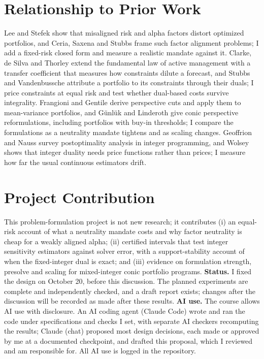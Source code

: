 \documentclass[11pt]{article}
\begin{document}
\section{Relationship to Prior Work}
Lee and Stefek \cite{lee2008risk} show that misaligned risk and alpha factors distort optimized portfolios, and Ceria, Saxena and Stubbs \cite{ceria2012factor} frame such factor alignment problems; I add a fixed-risk closed form and measure a realistic mandate against it. Clarke, de Silva and Thorley \cite{clarke2002portfolio} extend the fundamental law of active management with a transfer coefficient that measures how constraints dilute a forecast, and Stubbs and Vandenbussche \cite{stubbs2010constraint} attribute a portfolio to its constraints through their duals; I price constraints at equal risk and test whether dual-based costs survive integrality. Frangioni and Gentile \cite{frangioni2006perspective} derive perspective cuts and apply them to mean-variance portfolios, and G\"unl\"uk and Linderoth \cite{gunluk2010perspective} give conic perspective reformulations, including portfolios with buy-in thresholds; I compare the formulations as a neutrality mandate tightens and as scaling changes. Geoffrion and Nauss \cite{geoffrion1977parametric} survey postoptimality analysis in integer programming, and Wolsey \cite{wolsey1981integer} shows that integer duality needs price functions rather than prices; I measure how far the usual continuous estimators drift.

\section{Project Contribution}
This problem-formulation project is not new research; it contributes (i) an equal-risk account of what a neutrality mandate costs and why factor neutrality is cheap for a weakly aligned alpha; (ii) certified intervals that test integer sensitivity estimators against solver error, with a support-stability account of when the fixed-integer dual is exact; and (iii) evidence on formulation strength, presolve and scaling for mixed-integer conic portfolio programs.
\textbf{Status.} I fixed the design on October 20, before this discussion. The planned experiments are complete and independently checked, and a draft report exists; changes after the discussion will be recorded as made after these results.
\textbf{AI use.} The course allows AI use with disclosure. An AI coding agent (Claude Code) wrote and ran the code under specifications and checks I set, with separate AI checkers recomputing the results; Claude (chat) proposed most design decisions, each made or approved by me at a documented checkpoint, and drafted this proposal, which I reviewed and am responsible for. All AI use is logged in the repository.

{\footnotesize


}
\end{document}
